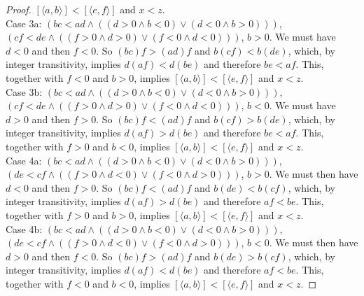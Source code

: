 \documentclass{report}
\begin{document}
\begin{proof}
$[\langle a,b\rangle]<[\langle e,f\rangle]$ and $x<z$.\\
\indent Case 3a: $(bc<ad\land((d>0\land b<0)\lor(d<0\land b>0)))$, $(cf<de\land((f>0\land d>0)\lor(f<0\land d<0)))$, $b>0$. We must have $d<0$ and then $f<0$. So
$(bc)f>(ad)f$ and $b(cf)<b(de)$, which, by integer transitivity, implies $d(af)<d(be)$ and therefore $be<af$. This, together with $f<0$ and $b>0$, implies 
$[\langle a,b\rangle]<[\langle e,f\rangle]$ and $x<z$.\\
\indent Case 3b: $(bc<ad\land((d>0\land b<0)\lor(d<0\land b>0)))$, $(cf<de\land((f>0\land d>0)\lor(f<0\land d<0)))$, $b<0$. We must have $d>0$ and then $f>0$. So
$(bc)f<(ad)f$ and $b(cf)>b(de)$, which, by integer transitivity, implies $d(af)>d(be)$ and therefore $be<af$. This, together with $f>0$ and $b<0$, implies 
$[\langle a,b\rangle]<[\langle e,f\rangle]$ and $x<z$.\\
\indent Case 4a: $(bc<ad\land((d>0\land b<0)\lor(d<0\land b>0)))$, $(de<cf\land((f>0\land d<0)\lor(f<0\land d>0)))$, $b>0$. We must then have $d<0$ and then $f>0$.
So $(bc)f<(ad)f$ and $b(de)<b(cf)$, which, by integer transitivity, implies $d(af)>d(be)$ and therefore $af<be$. This, together with $f>0$ and $b>0$, implies 
$[\langle a,b\rangle]<[\langle e,f\rangle]$ and $x<z$.\\
\indent Case 4b: $(bc<ad\land((d>0\land b<0)\lor(d<0\land b>0)))$, $(de<cf\land((f>0\land d<0)\lor(f<0\land d>0)))$, $b<0$. We must then have $d>0$ and then $f<0$.
So $(bc)f>(ad)f$ and $b(de)>b(cf)$, which, by integer transitivity, implies $d(af)<d(be)$ and therefore $af<be$. This, together with $f<0$ and $b<0$, implies 
$[\langle a,b\rangle]<[\langle e,f\rangle]$ and $x<z$.
\end{proof}
\end{document}
